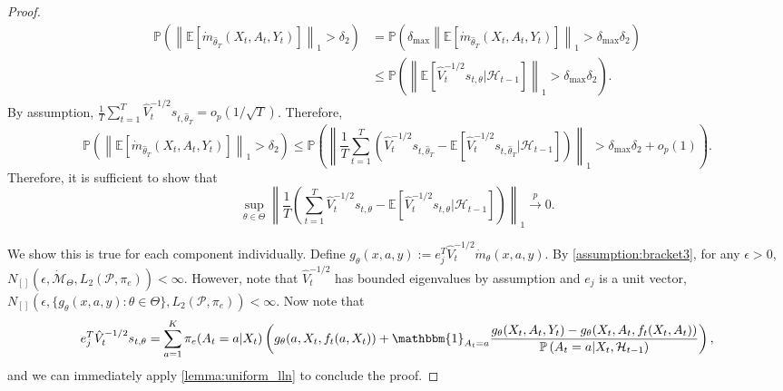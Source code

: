 \documentclass[10pt,a4paper]{amsart}
\newcommand{\E}{\mathbb{E}}
\newcommand{\norm}[1]{\left\lVert#1\right\rVert}
\begin{document}
\begin{proof}
\begin{align*}
    \mathbb{P} \left( \norm{ \E\left[ \dot{m}_{\hat{\theta}_{T}}(X_{t},A_{t},Y_{t}) \right]}_{1} > \delta_{2} \right) &=     \mathbb{P} \left( \delta_{\text{max}} \norm{ \E\left[ \dot{m}_{\hat{\theta}_{T}}(X_{t},A_{t},Y_{t}) \right]}_{1} > \delta_{\text{max}} \delta_{2} \right)\\
    &\le  \mathbb{P} \left( \norm{\mathbb{E}\left[\hat{V}_{t}^{-1/2}s_{t,\theta} | \mathcal{H}_{t-1} \right]}_{1} > \delta_{\text{max}} \delta_{2} \right).
\end{align*}
By assumption, $\frac{1}{T}\sum_{t=1}^{T} \hat{V}_{t}^{-1/2} s_{t,\hat{\theta}_{T}} = o_{p}(1/\sqrt{T})$. Therefore, 
$$ \mathbb{P} \left( \norm{ \E\left[ \dot{m}_{\hat{\theta}_{T}}(X_{t},A_{t},Y_{t}) \right]}_{1} > \delta_{2} \right) \le \mathbb{P} \left( \norm{\frac{1}{T} \sum_{t=1}^{T} \left(\hat{V}_{t}^{-1/2} s_{t,\hat{\theta}_{T}} - \mathbb{E}\left[\hat{V}_{t}^{-1/2}s_{t,\hat{\theta}_{T}} | \mathcal{H}_{t-1}\right]\right)}_{1} > \delta_{\text{max}} \delta_{2} + o_{p}(1) \right).$$
Therefore, it is sufficient to show that 
$$\sup_{\theta \in \Theta }\norm{\frac{1}{T} \left(\sum_{t=1}^{T} \hat{V}_{t}^{-1/2} s_{t,\theta} - \mathbb{E}\left[\hat{V}_{t}^{-1/2}s_{t,\theta} |\mathcal{H}_{t-1}\right]\right)}_{1} \overset{p}{\rightarrow}  0.$$

We show this is true for each component individually. Define $g_{\theta}(x,a,y) := e_{j}^{T}\hat{V}_{t}^{-1/2} \dot{m}_{\theta}(x,a,y)$. By \cref{assumption:bracket3}, for any $\epsilon >0$, $N_{[]}(\epsilon, \dot{\mathcal{M}}_{\Theta}, L_{2}(\mathcal{P},\pi_{e})) < \infty$. However, note that $\hat{V}_{t}^{-1/2}$ has bounded eigenvalues by assumption and $e_j$ is a unit vector, $N_{[]}(\epsilon, \{g_{\theta}(x,a,y) : \theta \in \Theta\}, L_{2}(\mathcal{P},\pi_{e})) < \infty$. Now note that
$$ e_{j}^{T}\hat{V}_{t}^{-1/2} s_{t,\theta} =\sum_{a=1}^{K} \pi_{e}(A_{t} =a | X_{t}) \left( g_{\theta}(a,X_{t},f_{t}(a,X_{t}))   + \mathbbm{1}_{A_{t} = a} \frac{ g_{\theta}(X_{t},A_{t},Y_{t})  -  g_{\theta}(X_{t},A_{t},f_{t}(X_{t},A_{t})) }{ \mathbb{P} \left(A_{t} =a | X_{t},\mathcal{H}_{t-1} \right)  }\right),$$
and we can immediately apply \cref{lemma:uniform_lln} to conclude the proof. 
\end{proof}
\end{document}
